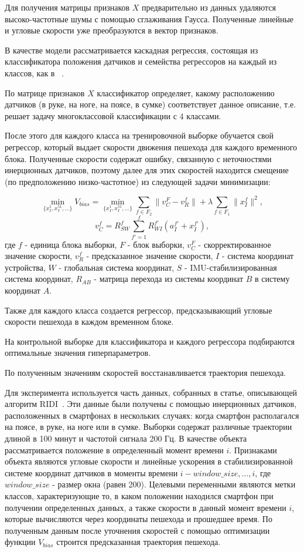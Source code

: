 \documentclass[12pt,twoside]{article}
\begin{document}
Для получения матрицы признаков $X$ предварительно из данных удаляются высоко-частотные шумы с помощью сглаживания Гаусса. Полученные линейные и угловые скорости уже преобразуются в вектор признаков.

В качестве модели рассматривается каскадная регрессия, состоящая из классификатора положения датчиков и семейства регрессоров на каждый из классов, как в ~\cite{journals/corr/abs-1712-09004}. 

По матрице признаков $X$ классификатор определяет, какому расположению датчиков (в руке, на ноге, на поясе, в сумке) соответствует данное описание, т.е. решает задачу многоклассовой классификации с 4 классами.

После этого для каждого класса на тренировочной выборке обучается свой регрессор, который выдает скорости движения пешехода для каждого временного блока. Полученные скорости содержат ошибку, связанную с неточностями инерционных датчиков, поэтому далее для этих скоростей находится смещение (по предположению низко-частотное) из следующей задачи минимизации:

\[\min_{\{x^1_I, x^51_I,\dots\}}V_{bias}=
\min_{\{x^1_I, x^51_I,\dots\}}\sum_{f \in F_2}\|v_C^F-v_R^f\|+
\lambda\sum_{f \in F_1}\|x^f_I\|^2,\]
\[v_C^f = R_{SW}^f\sum_{f'=1}^f R_{WI}^{f'}(a_I^{f'}+x_I^{f'}),\]
где $f$ - единица блока выборки, $F$ - блок выборки, $v_C^F$ - скорректированное значение скорости, $v_R^f$ - предсказанное значение скорости, $I$ - система координат устройства, $W$ - глобальная система координат, $S$ - IMU-стабилизированная система координат, $R_{AB}$ - матрица перехода из системы координат $B$ в систему координат $A$.

Также для каждого класса создается регрессор, предсказывающий угловые скорости пешехода в каждом временном блоке. 

На контрольной выборке для классификатора и каждого регрессора подбираются оптимальные значения гиперпараметров.

По полученным значениям скоростей восстанавливается траектория пешехода.


Для эксперимента используется часть данных, собранных в статье, описывающей алгоритм RIDI~\cite{journals/corr/abs-1712-09004}. Эти данные были получены с помощью инерционных датчиков, расположенных в смартфонах в нескольких случаях: когда смартфон располагался на поясе, в руке, на ноге или в сумке. Выборки содержат различные траектории длиной в 100 минут и частотой сигнала 200 Гц. В качестве объекта рассматривается положение в определенный момент времени $i$. Признаками объекта являются угловые скорости и линейные ускорения в стабилизированной системе координат датчиков в моменты времени $i-window\_size, \dots, i$, где $window\_size$ - размер окна (равен 200). Целевыми переменными являются метки классов, характеризующие то, в каком положении находился смартфон при получении определенных данных, а также скорости в данный момент времени $i$, которые вычисляются через координаты пешехода и прошедшее время. По полученным данным после уточнения скоростей с помощью оптимизации функции  $V_{bias}$ строится предсказанная траектория пешехода.
\end{document}
